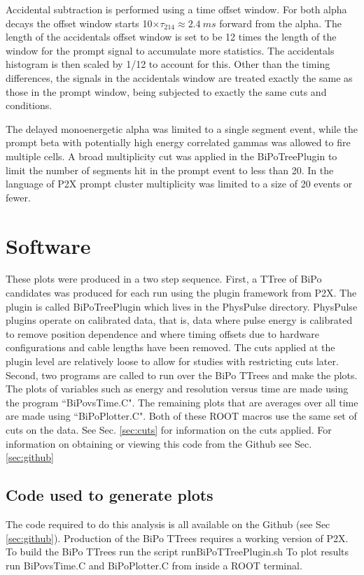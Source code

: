 Accidental subtraction is performed using a time offset window. For both alpha decays the offset window starts 10$\times\tau_{214}\approx2.4~ms$ forward from the alpha. The length of the accidentals offset window is set to be 12 times the length of the window for the prompt signal to accumulate more statistics. The accidentals histogram is then scaled by 1/12 to account for this. Other than the timing differences, the signals in the accidentals window are treated exactly the same as those in the prompt window, being subjected to exactly the same cuts and conditions.

The delayed monoenergetic alpha was limited to a single segment event, while the prompt beta with potentially high energy correlated gammas was allowed to fire multiple cells. A broad multiplicity cut was applied in the BiPoTreePlugin to limit the number of segments hit in the prompt event to less than 20. In the language of P2X prompt cluster multiplicity was limited to a size of 20 events or fewer.

\section{Software}
These plots were produced in a two step sequence. First, a TTree of BiPo candidates was produced for each run using the plugin framework from P2X. The plugin is called BiPoTreePlugin which lives in the PhysPulse directory. PhysPulse plugins operate on calibrated data, that is, data where pulse energy is calibrated to remove position dependence and where timing offsets due to hardware configurations and cable lengths have been removed. The cuts applied at the plugin level are relatively loose to allow for studies with restricting cuts later. Second, two programs are called to run over the BiPo TTrees and make the plots. The plots of variables such as energy and resolution versus time are made using the program ``BiPovsTime.C". The remaining plots that are averages over all time are made using ``BiPoPlotter.C".  Both of these ROOT macros use the same set of cuts on the data. See Sec. \ref{sec:cuts} for information on the cuts applied. For information on obtaining or viewing this code from the Github see Sec. \ref{sec:github} 
\subsection{Code used to generate plots}
The code required to do this analysis is all available on the Github (see Sec \ref{sec:github}). Production of the BiPo TTrees requires a working version of P2X. 
To build the BiPo TTrees run the script runBiPoTTreePlugin.sh
To plot results run BiPovsTime.C and BiPoPlotter.C from inside a ROOT terminal. 
